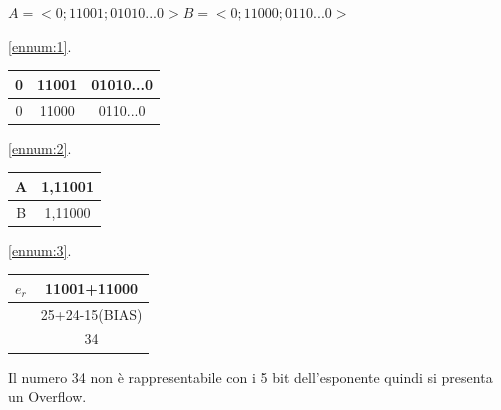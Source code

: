 \begin{example}[Moltiplicazione]
    $A=<0;11001;01010...0>$\hspace{1cm}$B=<0;11000;0110...0>$
    \begin{center}
    \ref{ennum:1}.\hspace{1cm}
    \begin{tabular}{|c|c|c|}
        \hline0 & 11001 & 01010...0\\\hline
        \hline0 & 11000 & 0110...0\\\hline
    \end{tabular}
    \end{center}
    
    \begin{center}
    \ref{ennum:2}.\hspace{1cm}
    \begin{tabular}{|c|c|}
        \hline A & 1,11001\\\hline
        \hline B & 1,11000\\\hline
    \end{tabular}
    \end{center}
    
    \begin{center}
    \ref{ennum:3}.\hspace{1cm}
    \begin{tabular}{|c|c|}
        \hline $e_r$ & 11001+11000\\\hline
        \hline & 25+24-15(BIAS)\\\hline
        \hline & 34\\\hline
    \end{tabular}
    \end{center}
    
    Il numero 34 non è rappresentabile con i 5 bit dell'esponente quindi si presenta un Overflow.
    
\end{example}

